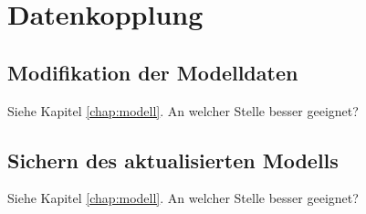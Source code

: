 \chapter{Datenkopplung}

\section{Modifikation der Modelldaten}
Siehe Kapitel \ref{chap:modell}. An welcher Stelle besser geeignet?

\section{Sichern des aktualisierten Modells}
Siehe Kapitel \ref{chap:modell}. An welcher Stelle besser geeignet?
